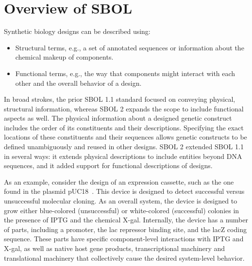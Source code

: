 \section{Overview of SBOL}

Synthetic biology designs can be described using:
\begin{itemize}
\item Structural terms, e.g., a set of annotated sequences or information about the chemical makeup of components.
\item Functional terms, e.g., the way that components might interact with each other and the overall behavior of a design.
\end{itemize}
In broad strokes, the prior SBOL 1.1 standard focused on conveying physical, structural information, whereas SBOL 2 expands the scope to include functional aspects as well. 
The physical information about a designed genetic construct includes the order of its constituents and their descriptions. Specifying the exact locations of these constituents and their sequences allows genetic constructs to be defined unambiguously and reused in other designs. SBOL 2 extended SBOL 1.1 in several ways: it extends physical descriptions to include entities beyond DNA sequences, and it added support for functional descriptions of designs. 

As an example, consider the design of an expression cassette, such as the one found in the plasmid pUC18~\cite{L08752.1}. This device is designed to detect successful versus unsuccessful molecular cloning. 
As an overall system, the device is designed to grow either blue-colored (unsuccessful) or white-colored (successful) colonies in the presence of IPTG and the chemical X-gal. Internally, the device has a number of parts, including a promoter, the lac repressor binding site, and the lacZ coding sequence. 
These parts have specific component-level interactions with IPTG and X-gal, as well as native host gene products, transcriptional machinery and translational machinery that collectively cause the desired system-level behavior. 

